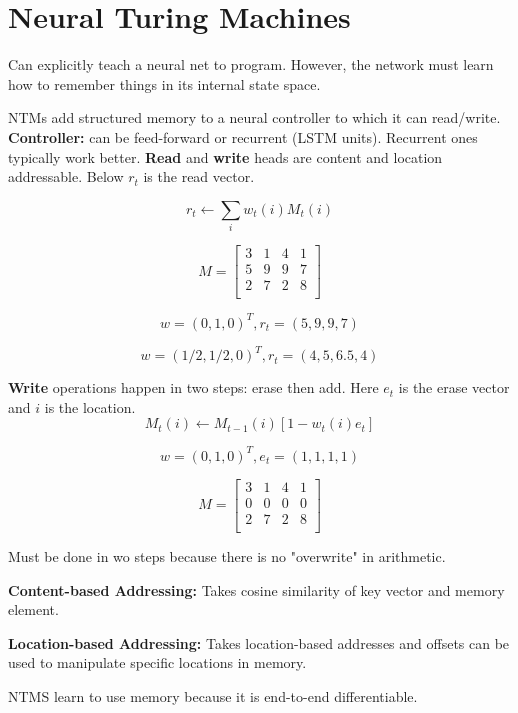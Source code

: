 \section{Neural Turing Machines}

Can explicitly teach a neural net to program. However, the network must learn how to remember things in its internal state space.

NTMs add structured memory to a neural controller to which it can read/write. \textbf{Controller:} can be feed-forward or recurrent (LSTM units). Recurrent ones typically work better. \textbf{Read} and \textbf{write} heads are content and location addressable. Below $r_t$ is the read vector.

$$ r_t \leftarrow \sum_i w_t(i) M_t(i) $$

$$ M = \begin{bmatrix}
  3 & 1 & 4 & 1 \\
  5 & 9 & 9 & 7 \\
  2 & 7 & 2 & 8 \\
\end{bmatrix}
$$

\[ w = (0, 1, 0)^T, r_t = (5, 9, 9, 7) \]

\[ w = (1/2, 1/2, 0)^T, r_t = (4, 5, 6.5, 4) \]

\textbf{Write} operations happen in two steps: erase then add. Here $e_t$ is the erase vector and $i$ is the location.
$$ M_t(i) \leftarrow M_{t - 1}(i)[1 - w_t(i)e_t]$$

\[ w = (0, 1, 0)^T, e_t = (1, 1, 1, 1) \]

$$ M = \begin{bmatrix}
  3 & 1 & 4 & 1 \\
  0 & 0 & 0 & 0 \\
  2 & 7 & 2 & 8 \\
\end{bmatrix}
$$

Must be done in wo steps because there is no "overwrite" in arithmetic. 

\textbf{Content-based Addressing:} Takes cosine similarity of key vector and memory element. 

\textbf{Location-based Addressing:} Takes location-based addresses and offsets can be used to manipulate specific locations in memory.

NTMS learn to use memory because it is end-to-end differentiable.

